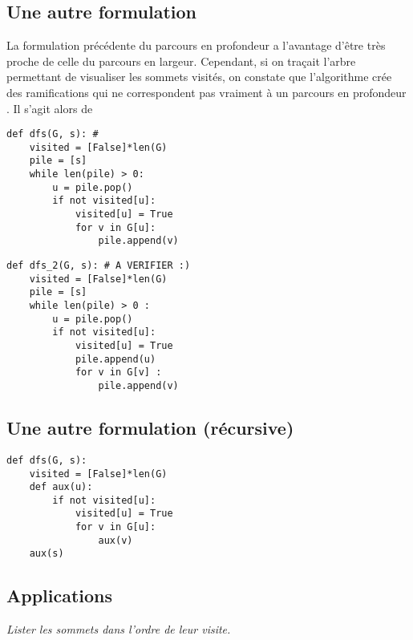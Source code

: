 \subsection{Une autre formulation}
La formulation précédente du parcours en profondeur a l'avantage d'être très proche de celle du parcours en largeur. Cependant, si on traçait l'arbre permettant de visualiser les sommets visités, on constate que l'algorithme crée des ramifications qui ne correspondent pas vraiment à un parcours en profondeur . 
Il s'agit alors de 

\begin{minipage}[c]{.45\linewidth}
\begin{lstlisting}
def dfs(G, s): #
    visited = [False]*len(G)
    pile = [s]
    while len(pile) > 0:
        u = pile.pop()
        if not visited[u]:
            visited[u] = True
            for v in G[u]:
                pile.append(v)
\end{lstlisting}
\end{minipage}
\hfill
\begin{minipage}[c]{.45\linewidth}
\begin{lstlisting}
def dfs_2(G, s): # A VERIFIER :)
    visited = [False]*len(G)
    pile = [s]
    while len(pile) > 0 :
        u = pile.pop()
        if not visited[u]:
            visited[u] = True
            pile.append(u)
            for v in G[v] :
                pile.append(v)
\end{lstlisting}
\end{minipage}

\subsection{Une autre formulation (récursive)}

\begin{lstlisting}
def dfs(G, s):
    visited = [False]*len(G)
    def aux(u):
        if not visited[u]:
            visited[u] = True
            for v in G[u]:
                aux(v)
    aux(s)

\end{lstlisting}

\subsection{Applications}
\begin{exemple}
\textit{Lister les sommets dans l'ordre de leur visite.}
\end{exemple}


